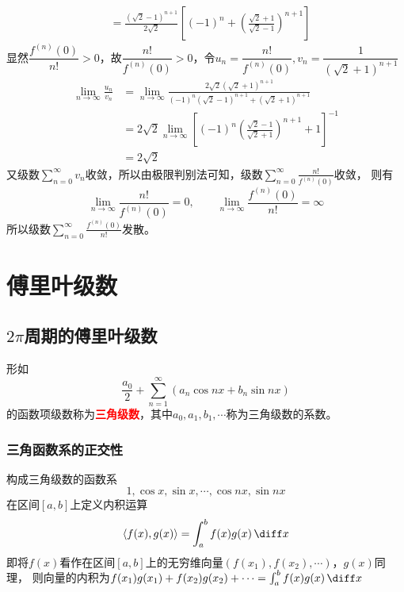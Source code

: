 \begin{solution}
\begin{enumerate}[(1)]
\begin{align*}
                   & = \frac{(\sqrt{2}-1)^{n+1}}{2\sqrt{2}}\left[(-1)^n + \left(\frac{\sqrt{2}+1}{\sqrt{2}-1}\right)^{n+1}\right]
              \end{align*}
              显然$\dfrac{f^{(n)}(0)}{n!}>0$，故$\dfrac{n!}{f^{(n)}(0)}>0$，令$u_n=\dfrac{n!}{f^{(n)}(0)},v_n = \dfrac{1}{(\sqrt{2}+1)^{n+1}}$
              \begin{align*}
                  \lim_{n\to\infty} \frac{u_n}{v_n}
                   & = \lim_{n\to\infty} \frac{2\sqrt{2}(\sqrt{2}+1)^{n+1}}{(-1)^n(\sqrt{2}-1)^{n+1} + (\sqrt{2}+1)^{n+1}}     \\
                   & = 2\sqrt{2}\lim_{n\to\infty} \left[(-1)^n\left(\frac{\sqrt{2}-1}{\sqrt{2}+1}\right)^{n+1} + 1\right]^{-1} \\
                   & = 2\sqrt{2}
              \end{align*}
              又级数$\displaystyle\sum_{n=0}^\infty v_n$收敛，所以由极限判别法可知，级数$\displaystyle\sum_{n=0}^\infty \frac{n!}{f^{(n)}(0)}$收敛，
              则有\[\lim_{n\to\infty} \frac{n!}{f^{(n)}(0)} = 0,\qquad \lim_{n\to\infty} \frac{f^{(n)}(0)}{n!} =\infty \]
              所以级数$\displaystyle\sum_{n=0}^\infty \frac{f^{(n)}(0)}{n!}$发散。

    \end{enumerate}
\end{solution}

\section{傅里叶级数}
\subsection{\texorpdfstring{$2\pi$}{2π}周期的傅里叶级数}
形如
\begin{equation}
    \frac{a_0}{2} + \sum_{n=1}^\infty(a_n\cos nx + b_n\sin nx)
\end{equation}
的函数项级数称为\textcolor{red}{\textbf{\textsf{三角级数}}}，其中$a_0,a_1,b_1,\cdots$称为三角级数的系数。

\subsubsection{三角函数系的正交性}
构成三角级数的函数系
\[ 1,\cos x,\sin x,\cdots,\cos nx, \sin nx \]
在区间$[a,b]$上定义内积运算
\begin{equation}
    \langle f(x),g(x) \rangle  = \int_a^b f(x)g(x)\,\diff x
\end{equation}
即将$f(x)$看作在区间$[a,b]$上的无穷维向量$(f(x_1),f(x_2),\cdots)$，$g(x)$同理，
则向量的内积为$f(x_1)g(x_1)+f(x_2)g(x_2)+\cdots = \int_a^b f(x)g(x)\,\diff x$


